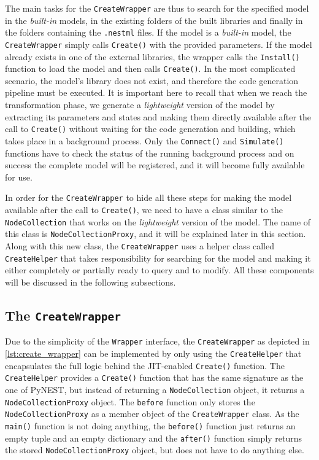 The main tasks for the \texttt{CreateWrapper} are thus to search for the specified model in the \emph{built-in} models, in the existing folders of the built libraries and finally in the folders containing the \texttt{.nestml} files. If the model is a \emph{built-in} model, the \texttt{CreateWrapper} simply calls \texttt{Create()} with the provided parameters. If the model already exists in one of the external libraries, the wrapper calls the \texttt{Install()} function to load the model and then calls \texttt{Create()}. In the most complicated scenario, the model's library does not exist, and therefore the code generation pipeline must be executed. It is important here to recall that when we reach the transformation phase, we generate a \emph{lightweight} version of the model by extracting its parameters and states and making them directly available after the call to \texttt{Create()} without waiting for the code generation and building, which takes place in a background process. Only the \texttt{Connect()} and \texttt{Simulate()} functions have to check the status of the running background process and on success the complete model will be registered, and it will become fully available for use.

In order for the \texttt{CreateWrapper} to hide all these steps for making the model available after the call to \texttt{Create()}, we need to have a class similar to the \texttt{NodeCollection} that works on the \emph{lightweight} version of the model. The name of this class is \texttt{NodeCollectionProxy}, and it will be explained later in this section. Along with this new class, the \texttt{CreateWrapper} uses a helper class called \texttt{CreateHelper} that takes responsibility for searching for the model and making it either completely or partially ready to query and to modify. All these components will be discussed in the following subsections.

\subsection{The \texttt{CreateWrapper}}

Due to the simplicity of the \texttt{Wrapper} interface, the \texttt{CreateWrapper} as depicted in \autoref{lst:create_wrapper} can be implemented by only using the \texttt{CreateHelper} that encapsulates the full logic behind the JIT-enabled \texttt{Create()} function. The \texttt{CreateHelper} provides a \texttt{Create()} function that has the same signature as the one of PyNEST, but instead of returning a \texttt{NodeCollection} object, it returns a \texttt{NodeCollectionProxy} object. The \texttt{before} function only stores the \texttt{NodeCollectionProxy} as a member object of the \texttt{CreateWrapper} class. As the \texttt{main()} function is not doing anything, the \texttt{before()} function just returns an empty tuple and an empty dictionary and the \texttt{after()} function simply returns the stored \texttt{NodeCollectionProxy} object, but does not have to do anything else.

